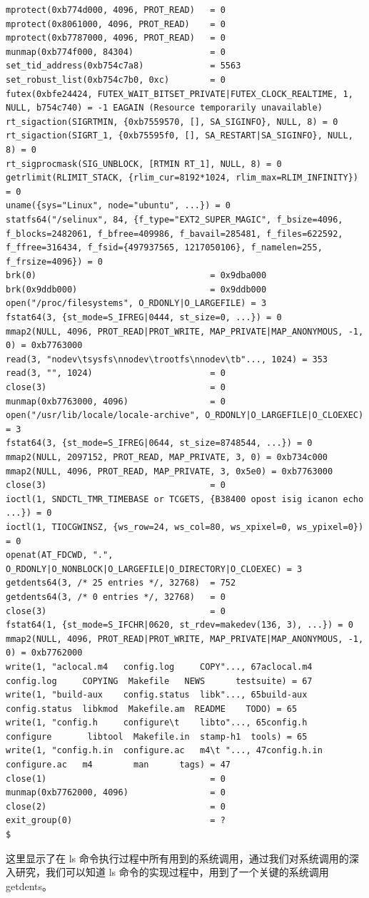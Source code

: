 {\begin{shaded}
\begin{verbatim}
mprotect(0xb774d000, 4096, PROT_READ)   = 0
mprotect(0x8061000, 4096, PROT_READ)    = 0
mprotect(0xb7787000, 4096, PROT_READ)   = 0
munmap(0xb774f000, 84304)               = 0
set_tid_address(0xb754c7a8)             = 5563
set_robust_list(0xb754c7b0, 0xc)        = 0
futex(0xbfe24424, FUTEX_WAIT_BITSET_PRIVATE|FUTEX_CLOCK_REALTIME, 1, NULL, b754c740) = -1 EAGAIN (Resource temporarily unavailable)
rt_sigaction(SIGRTMIN, {0xb7559570, [], SA_SIGINFO}, NULL, 8) = 0
rt_sigaction(SIGRT_1, {0xb75595f0, [], SA_RESTART|SA_SIGINFO}, NULL, 8) = 0
rt_sigprocmask(SIG_UNBLOCK, [RTMIN RT_1], NULL, 8) = 0
getrlimit(RLIMIT_STACK, {rlim_cur=8192*1024, rlim_max=RLIM_INFINITY}) = 0
uname({sys="Linux", node="ubuntu", ...}) = 0
statfs64("/selinux", 84, {f_type="EXT2_SUPER_MAGIC", f_bsize=4096, f_blocks=2482061, f_bfree=409986, f_bavail=285481, f_files=622592, f_ffree=316434, f_fsid={497937565, 1217050106}, f_namelen=255, f_frsize=4096}) = 0
brk(0)                                  = 0x9dba000
brk(0x9ddb000)                          = 0x9ddb000
open("/proc/filesystems", O_RDONLY|O_LARGEFILE) = 3
fstat64(3, {st_mode=S_IFREG|0444, st_size=0, ...}) = 0
mmap2(NULL, 4096, PROT_READ|PROT_WRITE, MAP_PRIVATE|MAP_ANONYMOUS, -1, 0) = 0xb7763000
read(3, "nodev\tsysfs\nnodev\trootfs\nnodev\tb"..., 1024) = 353
read(3, "", 1024)                       = 0
close(3)                                = 0
munmap(0xb7763000, 4096)                = 0
open("/usr/lib/locale/locale-archive", O_RDONLY|O_LARGEFILE|O_CLOEXEC) = 3
fstat64(3, {st_mode=S_IFREG|0644, st_size=8748544, ...}) = 0
mmap2(NULL, 2097152, PROT_READ, MAP_PRIVATE, 3, 0) = 0xb734c000
mmap2(NULL, 4096, PROT_READ, MAP_PRIVATE, 3, 0x5e0) = 0xb7763000
close(3)                                = 0
ioctl(1, SNDCTL_TMR_TIMEBASE or TCGETS, {B38400 opost isig icanon echo ...}) = 0
ioctl(1, TIOCGWINSZ, {ws_row=24, ws_col=80, ws_xpixel=0, ws_ypixel=0}) = 0
openat(AT_FDCWD, ".", O_RDONLY|O_NONBLOCK|O_LARGEFILE|O_DIRECTORY|O_CLOEXEC) = 3
getdents64(3, /* 25 entries */, 32768)  = 752
getdents64(3, /* 0 entries */, 32768)   = 0
close(3)                                = 0
fstat64(1, {st_mode=S_IFCHR|0620, st_rdev=makedev(136, 3), ...}) = 0
mmap2(NULL, 4096, PROT_READ|PROT_WRITE, MAP_PRIVATE|MAP_ANONYMOUS, -1, 0) = 0xb7762000
write(1, "aclocal.m4   config.log     COPY"..., 67aclocal.m4   config.log     COPYING  Makefile   NEWS      testsuite) = 67
write(1, "build-aux    config.status  libk"..., 65build-aux    config.status  libkmod  Makefile.am  README    TODO) = 65
write(1, "config.h     configure\t    libto"..., 65config.h     configure       libtool  Makefile.in  stamp-h1  tools) = 65
write(1, "config.h.in  configure.ac   m4\t "..., 47config.h.in  configure.ac   m4        man      tags) = 47
close(1)                                = 0
munmap(0xb7762000, 4096)                = 0
close(2)                                = 0
exit_group(0)                           = ?
$ 
\end{verbatim}\end{shaded}}
这里显示了在 ls
命令执行过程中所有用到的系统调用，通过我们对系统调用的深入研究，我们可以知道
ls 命令的实现过程中，用到了一个关键的系统调用 getdents。

